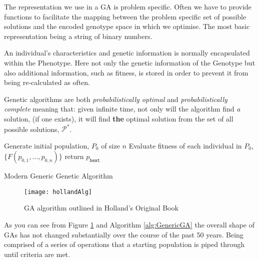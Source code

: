 The representation we use in a GA is problem specific. Often we have to provide functions to facilitate the mapping between the problem specific set of possible solutions and the encoded genotype space in which we optimise. The most basic representation being a string of binary numbers.

An individual's characteristics and genetic information is normally encapsulated within the Phenotype. Here not only the genetic information of the Genotype but also additional information, such as fitness, is stored in order to prevent it from being re-calculated as often.

Genetic algorithms are both \textit{probabilistically optimal} and \textit{probabilistically complete}\cite{kalaOnroadIntelligentVehicles2016} meaning that: given infinite time, not only will the algorithm find \textit{a} solution, (if one exists), it will find \textbf{the} optimal solution from the set of all possible solutions, $\mathcal{P}^*$.

\begin{algorithm}[H]
	\label{alg:GenericGA}
	\SetAlgoLined
	Generate initial population, $P_0$ of size $n$\;
	Evaluate fitness of each individual in $P_0$, $\{F(p_{0,1},\ldots, p_{0,n})\}$\;
	return $p_{\texttt{best}}$

	\caption{Modern Generic Genetic Algorithm}
\end{algorithm}

\begin{figure}[htpb]
    \centering
    \texttt{[image: hollandAlg]}
    \caption{GA algorithm outlined in Holland's Original Book\cite{hollandAdaptationNaturalArtificial1992a}}
    \label{fig:hollandAlg}
\end{figure}

As you can see from Figure \ref{fig:hollandAlg} and Algorithm \ref{alg:GenericGA} the overall shape of GAs has not changed substantially over the course of the past 50 years. Being comprised of a series of operations that a starting population is piped through until criteria are met.

